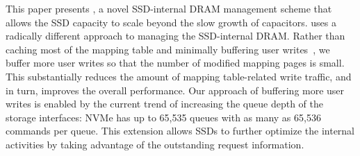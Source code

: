 
\iffalse
\textcolor{orange}{However, in our design,
we take a radically different approach. \ours{} protects a fraction of the mapping table. 
We buffer more user writes so that mapping entry eviction becomes more efficient
by aggregating dirty updates. This substantially reduces the
amount of mapping table-related write traffic, and in turn,
improves the overall performance.}
\fi

This paper presents \ours{}, a novel SSD-internal DRAM management scheme 
that allows the SSD capacity to scale beyond the slow growth of capacitors. 
\ours{} uses a radically different approach to managing the SSD-internal DRAM. 
Rather than caching most of the mapping table and minimally buffering user writes~\cite{KangLMKO14sigmod}, 
we buffer more user writes so that the number of modified mapping pages is small. 
This substantially reduces the amount of mapping table-related write traffic, 
and in turn, improves the overall performance.
Our approach of buffering more user writes is enabled by the current trend of increasing the queue depth of the storage interfaces: NVMe has up to 65,535 queues with as many as 65,536 commands per queue. This extension allows SSDs to further optimize the internal activities by taking advantage of the outstanding request information.

